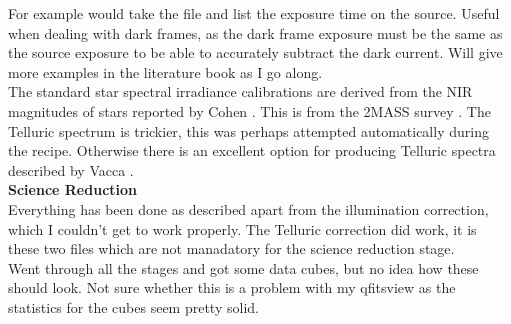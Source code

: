 \documentclass{literature}
\begin{document}
For example would take the file and list the exposure time on the source. Useful when dealing with dark frames, as the dark frame exposure must be the same as the source exposure to be able to accurately subtract the dark current. Will give more examples in the literature book as I go along. \\ 
The standard star spectral irradiance calibrations are derived from the NIR magnitudes of stars reported by Cohen \citep{Cohen2003}. This is from the 2MASS survey \citep{Skrutskie_2006}. The Telluric spectrum is trickier, this was perhaps attempted automatically during the recipe. Otherwise there is an excellent option for producing Telluric spectra described by Vacca \citep{Vacca2003}. \\ 
\textbf{Science Reduction} \\ 
Everything has been done as described apart from the illumination correction, which I couldn't get to work properly. The Telluric correction did work, it is these two files which are not manadatory for the science reduction stage. \\ 
Went through all the stages and got some data cubes, but no idea how these should look. Not sure whether this is a problem with my qfitsview as the statistics for the cubes seem pretty solid. 
\end{document}
